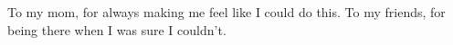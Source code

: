 


\vspace*{3cm}

\medskip

\begin{center}
To my mom, for always making me feel like I could do this.
To my friends, for being there when I was sure I couldn't. \\ \smallskip
\end{center}
